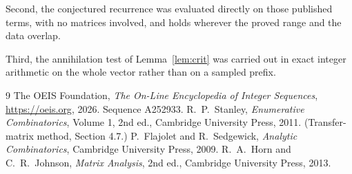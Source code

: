 \documentclass[11pt,a4paper]{article}
\theoremstyle{plain}
\theoremstyle{definition}
\begin{document}
Second, the conjectured recurrence was evaluated directly on those published terms, with no
matrices involved, and holds wherever the proved range and the data overlap.

Third, the annihilation test of Lemma~\ref{lem:crit} was carried out in exact integer
arithmetic on the whole vector rather than on a sampled prefix.

\begin{thebibliography}{9}
 The OEIS Foundation, \emph{The On-Line Encyclopedia of Integer
Sequences}, \url{https://oeis.org}, 2026. Sequence A252933.
 R.~P.~Stanley, \emph{Enumerative Combinatorics}, Volume 1, 2nd ed.,
Cambridge University Press, 2011. (Transfer-matrix method, Section 4.7.)
 P.~Flajolet and R.~Sedgewick, \emph{Analytic Combinatorics}, Cambridge
University Press, 2009.
 R.~A.~Horn and C.~R.~Johnson, \emph{Matrix Analysis}, 2nd ed., Cambridge
University Press, 2013.
\end{thebibliography}
\end{document}
